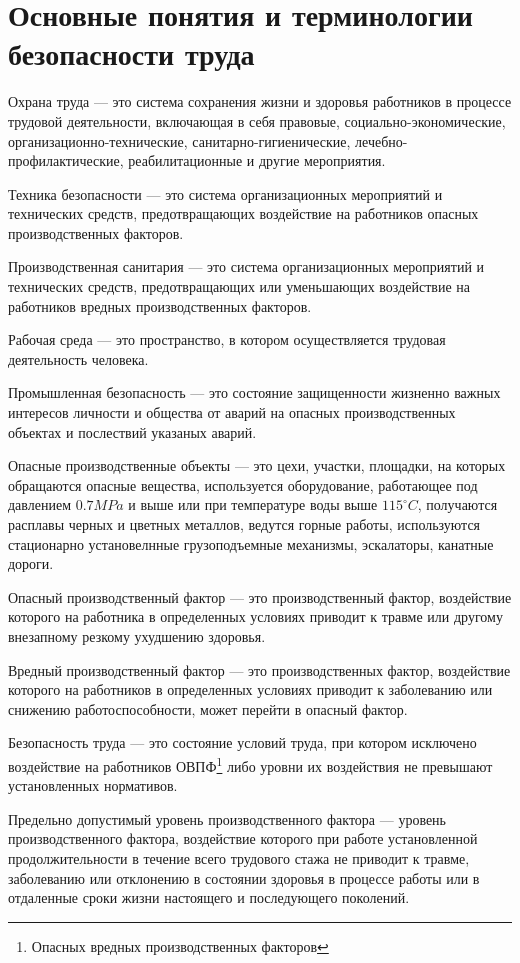 \section{Основные понятия и терминологии безопасности труда}
Охрана труда --- это система сохранения жизни и здоровья работников в процессе трудовой деятельности, включающая в себя правовые, социально-экономические, организационно-технические, санитарно-гигиенические, лечебно-профилактические, реабилитационные и другие мероприятия.

Техника безопасности --- это система организационных мероприятий и технических средств, предотвращающих воздействие на работников опасных производственных факторов.

Производственная санитария --- это система организационных мероприятий и технических средств, предотвращающих или уменьшающих воздействие на работников вредных производственных факторов.

Рабочая среда --- это пространство, в котором осуществляется трудовая деятельность человека.

Промышленная безопасность --- это состояние защищенности жизненно важных интересов личности и общества от аварий на опасных производственных объектах и послествий указаных аварий.

Опасные производственные объекты --- это цехи, участки, площадки, на которых обращаются опасные вещества, используется оборудование, работающее под давлением \(0.7MPa\) и выше или при температуре воды выше \(115^\circ C\), получаются расплавы черных и цветных металлов, ведутся горные работы, используются стационарно установелнные грузоподъемные механизмы, эскалаторы, канатные дороги.

Опасный производственный фактор --- это производственный фактор, воздействие которого на работника в определенных условиях приводит к травме или другому внезапному резкому ухудшению здоровья.

Вредный производственный фактор --- это производственных фактор, воздействие которого на работников в определенных условиях приводит к заболеванию или снижению работоспособности, может перейти в опасный фактор.

Безопасность труда --- это состояние условий труда, при котором исключено воздействие на работников ОВПФ\footnote{Опасных вредных производственных факторов} либо уровни их воздействия не превышают установленных нормативов.

Предельно допустимый уровень производственного фактора --- уровень производственного фактора, воздействие которого при работе установленной продолжительности в течение всего трудового стажа не приводит к травме, заболеванию или отклонению в состоянии здоровья в процессе работы или в отдаленные сроки жизни настоящего и последующего поколений.

